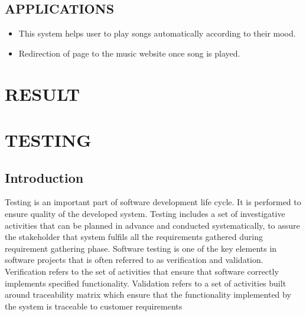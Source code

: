 \documentclass[12pt]{report}
\begin{document}
\vspace{1.5cm}
\normalsize
\subsection{  APPLICATIONS}
\begin{itemize}
\item This system helps user to play songs automatically according to their mood.\\
\item Redirection of page to the music website once song is played.

\end{itemize}
\clearpage

\centering
\section{RESULT}

\justifying
\setlength{\parindent}{4em}
\setlength{\parskip}{0.5em}
\renewcommand{\baselinestretch}{1.5}
\vspace{1cm}



\vspace{1cm}


\vspace{1.5cm}


\vspace{1cm}


\vspace{1.5cm}


\vspace{1cm}


\vspace{1cm}


\vspace{1.5cm}


\vspace{1cm}

\clearpage
\centering
\section{TESTING}
\justifying
\setlength{\parindent}{4em}
\setlength{\parskip}{0.5em}
\renewcommand{\baselinestretch}{1.5}
\normalsize
\subsection{ Introduction}
\hspace{1.7 cm}Testing is an important part of software development life cycle. It is performed to ensure 
quality of the developed system. Testing includes a set of investigative activities that can be 
planned in advance and conducted systematically, to assure the stakeholder that system 
fulfils all the requirements gathered during requirement gathering phase. Software testing is 
one of the key elements in software projects that is often referred to as verification and 
validation. Verification refers to the set of activities that ensure that software correctly 
implements specified functionality. Validation refers to a set of activities built around 
traceability matrix which ensure that the functionality implemented by the system is 
traceable to customer requirements
\end{document}
